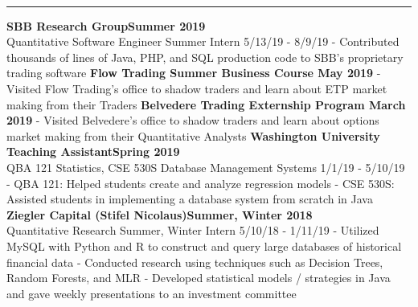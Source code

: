 \documentclass[11pt]{article}
\begin{document}
\begin{titlepage}
\begin{addmargin}[1em]{0em}
\begin{center}
\begin{minipage}[b]{0.3\textwidth}
				\end{minipage}
			\end{center}
		\end{addmargin}
		\vspace{-10pt}
		\noindent
		\\\rule{\textwidth}{0.4pt}
		\begin{addmargin}[1em]{0em}
    		\textbf{SBB Research Group\hfill Summer 2019}\\
Quantitative Software Engineer Summer Intern \hfill {\small{5/13/19 - 8/9/19}}\newline
- Contributed thousands of lines of Java, PHP, and SQL production code to SBB's proprietary trading software\newline
            \textbf{Flow Trading Summer Business Course \hfill May 2019}\newline
- Visited Flow Trading's office to shadow traders and learn about ETP market making from their Traders\newline
            \textbf{Belvedere Trading Externship Program \hfill March 2019}\newline
- Visited Belvedere's office to shadow traders and learn about options market making from their Quantitative Analysts\newline
		    \textbf{Washington University Teaching Assistant\hfill Spring 2019}\\
QBA 121 Statistics, CSE 530S Database Management Systems \hfill {\small{1/1/19 - 5/10/19}}\newline
- QBA 121: Helped students create and analyze regression models\newline
- CSE 530S: Assisted students in implementing a database system from scratch in Java\newline
			\textbf{Ziegler Capital (Stifel Nicolaus)\hfill Summer, Winter 2018}\\
Quantitative Research Summer, Winter Intern \hfill {\small{5/10/18 - 1/11/19}}\newline
- Utilized MySQL with Python and R to construct and query large databases of historical financial data \newline
- Conducted research using techniques such as Decision Trees, Random Forests, and MLR\newline
- Developed statistical models / strategies in Java and gave weekly presentations to an investment committee\newline

\end{addmargin}
\end{titlepage}
\end{document}
